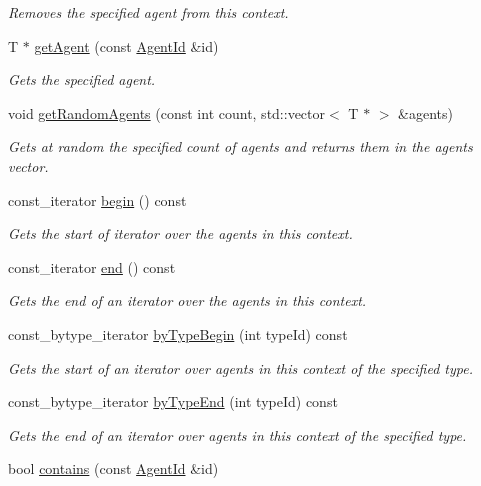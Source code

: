 \begin{DoxyCompactItemize}
\begin{DoxyCompactList}\small\item\em Removes the specified agent from this context. \end{DoxyCompactList}\item 
T $\ast$ \hyperlink{classrepast_1_1_context_a72ec330f6e930b4c83929a70df993b43}{get\-Agent} (const \hyperlink{classrepast_1_1_agent_id}{Agent\-Id} \&id)
\begin{DoxyCompactList}\small\item\em Gets the specified agent. \end{DoxyCompactList}\item 
void \hyperlink{classrepast_1_1_context_a543dcc0f3ea4ecbe054232eaaa9c72e4}{get\-Random\-Agents} (const int count, std\-::vector$<$ T $\ast$ $>$ \&agents)
\begin{DoxyCompactList}\small\item\em Gets at random the specified count of agents and returns them in the agents vector. \end{DoxyCompactList}\item 
const\-\_\-iterator \hyperlink{classrepast_1_1_context_a0c69277c868b42ee0bb0d3b90a1df46d}{begin} () const 
\begin{DoxyCompactList}\small\item\em Gets the start of iterator over the agents in this context. \end{DoxyCompactList}\item 
const\-\_\-iterator \hyperlink{classrepast_1_1_context_af584236067222d8c1a2aa51b5e396da4}{end} () const 
\begin{DoxyCompactList}\small\item\em Gets the end of an iterator over the agents in this context. \end{DoxyCompactList}\item 
const\-\_\-bytype\-\_\-iterator \hyperlink{classrepast_1_1_context_a2b77a55622dcdce4b82e8c2864642544}{by\-Type\-Begin} (int type\-Id) const 
\begin{DoxyCompactList}\small\item\em Gets the start of an iterator over agents in this context of the specified type. \end{DoxyCompactList}\item 
const\-\_\-bytype\-\_\-iterator \hyperlink{classrepast_1_1_context_aa7e427063cdbfc5e37764291df2b2b53}{by\-Type\-End} (int type\-Id) const 
\begin{DoxyCompactList}\small\item\em Gets the end of an iterator over agents in this context of the specified type. \end{DoxyCompactList}\item 
\hypertarget{classrepast_1_1_context_a579cde2d1318e073f9fd068a7b0ed1a5}{bool \hyperlink{classrepast_1_1_context_a579cde2d1318e073f9fd068a7b0ed1a5}{contains} (const \hyperlink{classrepast_1_1_agent_id}{Agent\-Id} \&id)}\label{classrepast_1_1_context_a579cde2d1318e073f9fd068a7b0ed1a5}


\end{DoxyCompactItemize}

